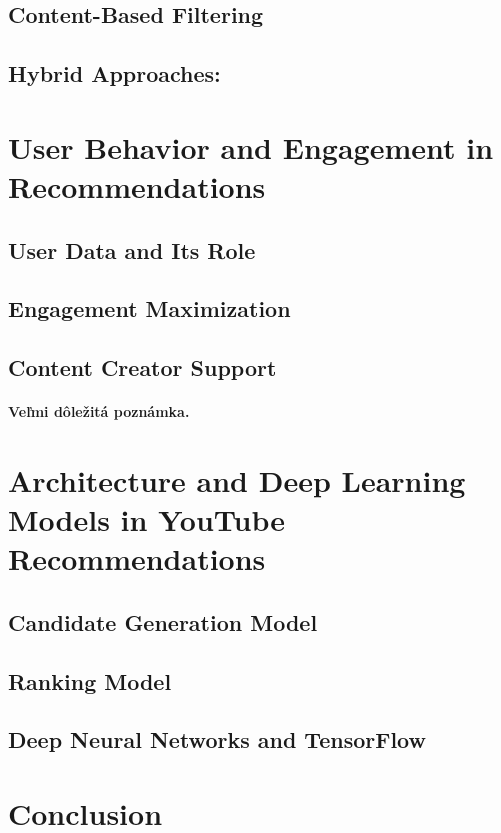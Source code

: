 \documentclass[10pt,twoside,slovak,a4paper]{coursepaper}
\begin{document}
\subsection{Content-Based Filtering} \label{core:cont-based}
\subsection{Hybrid Approaches:} \label{core:hybrid}

\section{User Behavior and Engagement in Recommendations} \label{behavior}
\subsection{User Data and Its Role} \label{behavior:userdata}
\subsection{Engagement Maximization} \label{behavior:engagement}
\subsection{Content Creator Support} \label{behavior:ccsuport}
\paragraph{Veľmi dôležitá poznámka.}
\section{Architecture and Deep Learning Models in YouTube Recommendations} \label{arch}
\subsection{Candidate Generation Model} \label{arch:cangen}
\subsection{Ranking Model} \label{arch:rank}
\subsection{Deep Neural Networks and TensorFlow} \label{arch:dnnt}
\section{Conclusion} \label{dolezitejsia}



\end{document}
